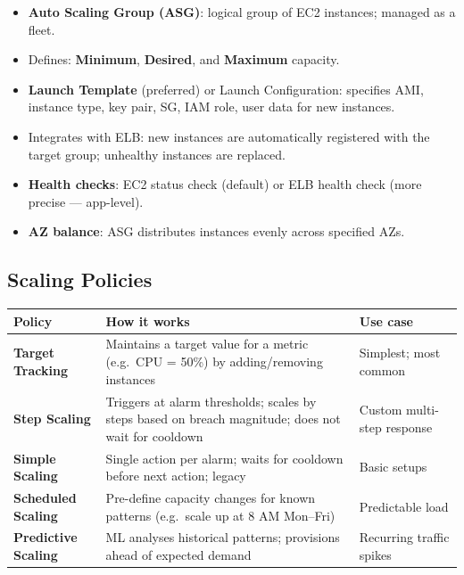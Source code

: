

\begin{keyfacts}
\begin{itemize}
  \item \textbf{Auto Scaling Group (ASG)}: logical group of EC2 instances; managed as a fleet.
  \item Defines: \textbf{Minimum}, \textbf{Desired}, and \textbf{Maximum} capacity.
  \item \textbf{Launch Template} (preferred) or Launch Configuration: specifies AMI, instance
        type, key pair, SG, IAM role, user data for new instances.
  \item Integrates with ELB: new instances are automatically registered with the target group;
        unhealthy instances are replaced.
  \item \textbf{Health checks}: EC2 status check (default) or ELB health check
        (more precise --- app-level).
  \item \textbf{AZ balance}: ASG distributes instances evenly across specified AZs.
\end{itemize}
\end{keyfacts}

\subsection{Scaling Policies}

\begin{comparebox}[title={Auto Scaling policy types}]
\begin{tabular}{@{}p{3.5cm}p{5cm}p{3.5cm}@{}}
\toprule
\textbf{Policy} & \textbf{How it works} & \textbf{Use case} \\
\midrule
\textbf{Target Tracking}  & Maintains a target value for a metric
    (e.g.\ CPU = 50\%) by adding/removing instances & Simplest; most common \\[4pt]
\textbf{Step Scaling}     & Triggers at alarm thresholds; scales by steps
    based on breach magnitude; does not wait for cooldown & Custom multi-step response \\[4pt]
\textbf{Simple Scaling}   & Single action per alarm; waits for cooldown
    before next action; legacy & Basic setups \\[4pt]
\textbf{Scheduled Scaling} & Pre-define capacity changes for known patterns
    (e.g.\ scale up at 8 AM Mon--Fri) & Predictable load \\[4pt]
\textbf{Predictive Scaling} & ML analyses historical patterns; provisions
    ahead of expected demand & Recurring traffic spikes \\
\bottomrule
\end{tabular}
\end{comparebox}

